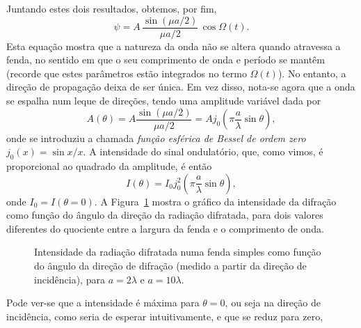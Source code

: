 Juntando estes dois resultados, obtemos, por fim,
\begin{equation*}
    \psi = A\,\frac{\sin(\mu a/2)}{\mu a/2}\,\cos\Omega(t).
\end{equation*}
Esta equação mostra que a natureza da onda não se altera quando atravessa a
fenda, no sentido em que o seu comprimento de onda e período se mantêm (recorde
que estes parâmetros estão integrados no termo $\Omega(t)$). No entanto, a
direção de propagação deixa de ser única. Em vez disso, nota-se agora que a onda
se espalha num leque de direções, tendo uma amplitude variável dada por
\begin{equation*}
    A(\theta)=A\frac{\sin(\mu a/2)}{\mu
    a/2}=Aj_0(\pi\frac{a}{\lambda}\sin\theta),
\end{equation*}
onde se introduziu a chamada \emph{função esférica de Bessel de ordem zero}
$j_0(x)=\sin x/x$. A intensidade do sinal ondulatório, que, como vimos, é
proporcional ao quadrado da amplitude, é então
\begin{equation}
    I(\theta)= I_0 j_0^2(\pi\frac{a}{\lambda}\sin\theta),
\end{equation}
onde $I_0=I(\theta=0)$. A Figura~\ref{fig:oof120} mostra o gráfico da
intensidade da difração como função do ângulo da direção da radiação difratada,
para dois valores diferentes do quociente entre a largura da fenda e o
comprimento de onda.
\begin{figure}[htb]
\begin{center}
\caption{Intensidade da radiação difratada numa fenda simples como função do
ângulo da direção de difração (medido a partir da direção de incidência), para
$a=2\lambda$ e $a=10\lambda$.%
\label{fig:oof120}}
\end{center}
\end{figure}
Pode ver-se que a intensidade é máxima para $\theta=0$, ou seja na direção de
incidência, como seria de esperar intuitivamente, e que se reduz para zero,
